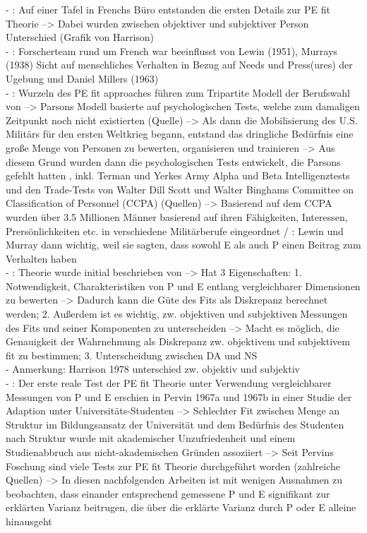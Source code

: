 - \cite[S. 4f.]{caplan:1993}: Auf einer Tafel in Frenchs Büro entstanden die ersten Details zur PE fit Theorie --> Dabei wurden zwischen objektiver und subjektiver Person Unterschied (Grafik von Harrison) \\
- \cite[S. 5]{caplan:1993}: Forscherteam rund um French war beeinflusst von Lewin (1951), Murrays (1938) Sicht auf menschliches Verhalten in Bezug auf Needs und Press(ures) der Ugebung und Daniel Millers (1963) \\
- \cite[S. 1]{su:2015}: Wurzeln des PE fit approaches führen zum Tripartite Modell der Berufswahl von \textcite{parsons:1909} --> Parsons Modell basierte auf psychologischen Tests, welche zum damaligen Zeitpunkt noch nicht existierten (Quelle) --> Als dann die Mobilisierung des U.S. Militärs für den ersten Weltkrieg begann, entstand das dringliche Bedürfnis eine große Menge von Personen zu bewerten, organisieren und trainieren --> Aus diesem Grund wurden dann die psychologischen Tests entwickelt, die Parsons gefehlt hatten , inkl. Terman und Yerkes Army Alpha und Beta Intelligenztests und den Trade-Tests von Walter Dill Scott und Walter Binghams Committee on Classification of Personnel (CCPA) (Quellen) --> Basierend auf dem CCPA wurden über 3.5 Millionen Männer basierend auf ihren Fähigkeiten, Interessen, Prersönlichkeiten etc. in verschiedene Militärberufe eingeordnet / \cite[S. 2]{su:2015}:  Lewin und Murray dann wichtig, weil sie sagten, dass sowohl E als auch P einen Beitrag zum Verhalten haben \\
- \cite[S. 2]{caplan:1987}: Theorie wurde initial beschrieben von \textcite{copingAndAdaption:1974} --> Hat 3 Eigenschaften: 1. Notwendigkeit, Charakteristiken von P und E entlang vergleichbarer Dimensionen zu bewerten --> Dadurch kann die Güte des Fits als Diskrepanz berechnet werden; 2. Außerdem ist es wichtig, zw. objektiven und subjektiven Messungen des Fits und seiner Komponenten zu unterscheiden --> Macht es möglich, die Genauigkeit der Wahrnehmung als Diskrepanz zw. objektivem und subjektivem fit zu bestimmen; 3. Unterscheidung zwischen DA und NS \\
- Anmerkung: Harrison 1978 unterschied zw. objektiv und subjektiv \\
- \cite[S. 8]{caplan:1987}: Der erste reale Test der PE fit Theorie unter Verwendung vergleichbarer Messungen von P und E erschien in Pervin 1967a und 1967b in einer Studie der Adaption unter Universitäts-Studenten --> Schlechter Fit zwischen Menge an Struktur im Bildungsansatz der Universität und dem Bedürfnis des Studenten nach Struktur wurde mit akademischer Unzufriedenheit und einem Studienabbruch aus nicht-akademischen Gründen assoziiert --> Seit Pervins Foschung sind viele Tests zur PE fit Theorie durchgeführt worden (zahlreiche Quellen) --> In diesen nachfolgenden Arbeiten ist mit wenigen Ausnahmen zu beobachten, dass einander entsprechend gemessene P und E signifikant zur erklärten Varianz beitrugen, die über die erklärte Varianz durch P oder E alleine hinausgeht \\

